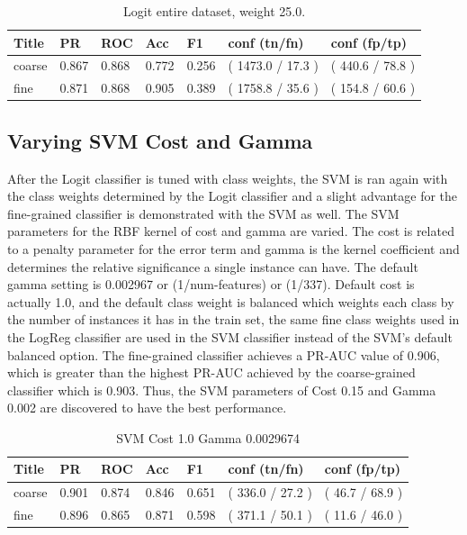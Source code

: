 \documentclass[ms]{nuthesis}
\begin{document}
\FloatBarrier
\begin{table}[H]
\centering
\caption{Logit entire dataset, weight 25.0.}
\label{tab:LogRegAll-Wt25}
\begin{tabular}{|l||l||l||l||l||l||l|}\toprule
Title & PR & ROC & Acc & F1 & conf (tn/fn) & conf (fp/tp) \\ \midrule
coarse & 0.867 & 0.868 & 0.772 & 0.256 & ( 1473.0 / 17.3 ) & ( 440.6 / 78.8 ) \\
fine & 0.871 & 0.868 & 0.905 & 0.389 & ( 1758.8 / 35.6 ) & ( 154.8 / 60.6 ) \\ \bottomrule
\end{tabular}
\end{table}
\FloatBarrier


\subsection{Varying SVM Cost and Gamma}
\label{sect:paramEnd}
\par After the Logit classifier is tuned with class weights, the SVM is ran again with the
class weights determined by the Logit classifier and a slight advantage for the fine-grained
classifier is demonstrated with the SVM as well. The SVM parameters for the RBF
kernel of cost and gamma are varied. The cost is related to a penalty parameter for the error term
and gamma is the kernel coefficient and determines the relative significance a single instance can have.
The default gamma setting is 0.002967 or (1/num-features) or (1/337). Default
 cost is actually 1.0, and the default class weight is balanced which weights each class by
 the number of instances it has in the train set, the same fine class weights used in the LogReg
 classifier are used in the SVM classifier instead of the SVM's default balanced option. The fine-grained
  classifier achieves a PR-AUC value of 0.906, which is greater than the highest PR-AUC achieved by
  the coarse-grained classifier which is 0.903. Thus, the SVM parameters of Cost 0.15 and Gamma 0.002
  are discovered to have the best performance.


\FloatBarrier
\begin{table}[H]
\centering
\caption{SVM Cost 1.0 Gamma 0.0029674}
\label{tab:SVM-C1-Gp0029674}
\begin{tabular}{|l||l||l||l||l||l||l|}\toprule
Title & PR & ROC & Acc & F1 & conf (tn/fn) & conf (fp/tp) \\ \midrule
coarse & 0.901 & 0.874 & 0.846 & 0.651 & ( 336.0 / 27.2 ) & ( 46.7 / 68.9 ) \\
fine & 0.896 & 0.865 & 0.871 & 0.598 & ( 371.1 / 50.1 ) & ( 11.6 / 46.0 ) \\ \bottomrule
\end{tabular}
\end{table}
\FloatBarrier
\end{document}
